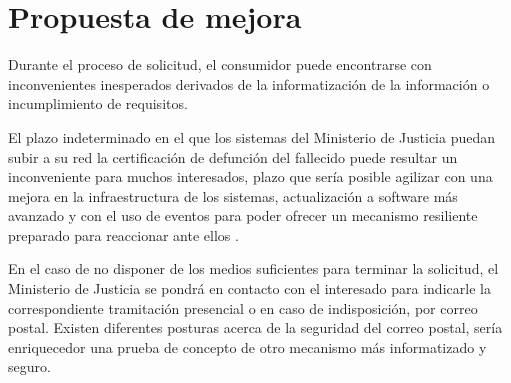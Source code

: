 \section{Propuesta de mejora}
Durante el proceso de solicitud, el consumidor puede encontrarse con inconvenientes inesperados derivados de la informatización de la información o incumplimiento de requisitos.

El plazo indeterminado en el que los sistemas del Ministerio de Justicia puedan subir a su red la certificación de defunción del fallecido puede resultar un inconveniente para muchos interesados, plazo que sería posible agilizar con una mejora en la infraestructura de los sistemas, actualización a software más avanzado y con el uso de eventos para poder ofrecer un mecanismo resiliente preparado para reaccionar ante ellos \cite{ben128event}.

En el caso de no disponer de los medios suficientes para terminar la solicitud, el Ministerio de Justicia se pondrá en contacto con el interesado para indicarle la correspondiente tramitación presencial o en caso de indisposición, por correo postal. Existen diferentes posturas acerca de la seguridad del correo postal, sería enriquecedor una prueba de concepto de otro mecanismo más informatizado y seguro.

